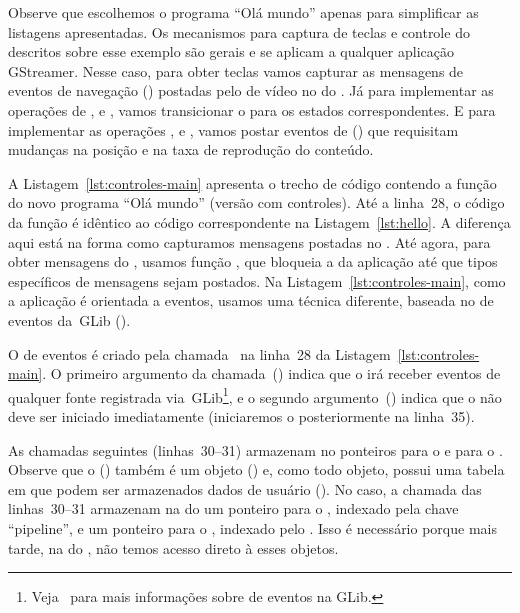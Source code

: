 \documentclass{SBCbookchapter}
\begin{document}

Observe que escolhemos o programa ``Olá mundo'' apenas para simplificar as
listagens apresentadas.  Os mecanismos para captura de teclas e controle do
 descritos sobre esse exemplo são gerais e se aplicam a
qualquer aplicação GStreamer.  Nesse caso, para obter teclas vamos capturar
as mensagens de eventos de navegação ()
postadas pelo  de vídeo no  do .  Já para
implementar as operações de ,  e , vamos
transicionar o  para os estados correspondentes.  E para
implementar as operações ,  e , vamos
postar eventos de  () que requisitam mudanças na
posição e na taxa de reprodução do conteúdo.

A Listagem~\ref{lst:controles-main} apresenta o trecho de código contendo a
função  do novo programa ``Olá mundo'' (versão com controles).  Até
a linha~28, o código da função é idêntico ao código correspondente na
Listagem~\ref{lst:hello}.  A diferença aqui está na forma como capturamos
mensagens postadas no .  Até agora, para obter mensagens do
, usamos função , que bloqueia a
 da aplicação até que tipos específicos de mensagens sejam
postados.  Na Listagem~\ref{lst:controles-main}, como a aplicação é
orientada a eventos, usamos uma técnica diferente, baseada no  de
eventos da~GLib ().

O  de eventos é criado pela chamada~ na linha~28
da Listagem~\ref{lst:controles-main}.  O primeiro argumento da
chamada~() indica que o  irá receber eventos de qualquer
fonte registrada via~GLib\footnote{Veja~\cite{glib} para mais informações
  sobre  de eventos na GLib.}, e o segundo argumento~()
indica que o  não deve ser iniciado imediatamente (iniciaremos o
 posteriormente na linha~35).

As chamadas  seguintes (linhas~30--31) armazenam no
 ponteiros para o  e para o .  Observe que o
 () também é um objeto () e, como todo objeto,
possui uma tabela  em que podem ser armazenados dados de usuário
().  No caso, a chamada das linhas~30--31 armazenam na
 do  um ponteiro para o , indexado pela chave
``pipeline'', e um ponteiro para o , indexado pelo .  Isso
é necessário porque mais tarde, na  do , não temos
acesso direto à esses objetos.
\end{document}
